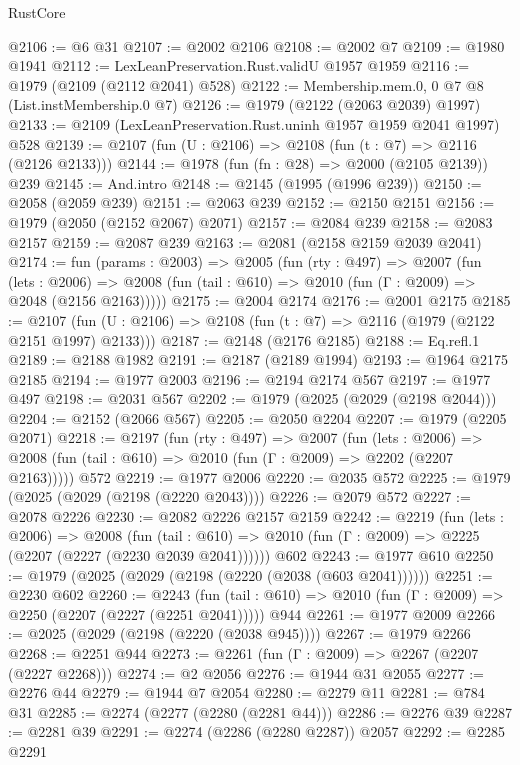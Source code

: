 \begin{lexlean}{RustCore}
\begin{coremodule}
@2106 := @6 @31
@2107 := @2002 @2106
@2108 := @2002 @7
@2109 := @1980 @1941
@2112 := LexLeanPreservation.Rust.validU @1957 @1959
@2116 := @1979 (@2109 (@2112 @2041) @528)
@2122 := Membership.mem.{0, 0} @7 @8 (List.instMembership.{0} @7)
@2126 := @1979 (@2122 (@2063 @2039) @1997)
@2133 := @2109 (LexLeanPreservation.Rust.uninh @1957 @1959 @2041 @1997) @528
@2139 := @2107 (fun (U : @2106) => @2108 (fun (t : @7) => @2116 (@2126 @2133)))
@2144 := @1978 (fun (fn : @28) => @2000 (@2105 @2139)) @239
@2145 := And.intro
@2148 := @2145 (@1995 (@1996 @239))
@2150 := @2058 (@2059 @239)
@2151 := @2063 @239
@2152 := @2150 @2151
@2156 := @1979 (@2050 (@2152 @2067) @2071)
@2157 := @2084 @239
@2158 := @2083 @2157
@2159 := @2087 @239
@2163 := @2081 (@2158 @2159 @2039 @2041)
@2174 := fun (params : @2003) =>
  @2005
    (fun (rty : @497) =>
    @2007
      (fun (lets : @2006) =>
      @2008 (fun (tail : @610) => @2010 (fun (Γ : @2009) => @2048 (@2156 @2163)))))
@2175 := @2004 @2174
@2176 := @2001 @2175
@2185 := @2107 (fun (U : @2106) => @2108 (fun (t : @7) => @2116 (@1979 (@2122 @2151 @1997) @2133)))
@2187 := @2148 (@2176 @2185)
@2188 := Eq.refl.{1}
@2189 := @2188 @1982
@2191 := @2187 (@2189 @1994)
@2193 := @1964 @2175 @2185
@2194 := @1977 @2003
@2196 := @2194 @2174 @567
@2197 := @1977 @497
@2198 := @2031 @567
@2202 := @1979 (@2025 (@2029 (@2198 @2044)))
@2204 := @2152 (@2066 @567)
@2205 := @2050 @2204
@2207 := @1979 (@2205 @2071)
@2218 := @2197
    (fun (rty : @497) =>
    @2007
      (fun (lets : @2006) =>
      @2008 (fun (tail : @610) => @2010 (fun (Γ : @2009) => @2202 (@2207 @2163)))))
    @572
@2219 := @1977 @2006
@2220 := @2035 @572
@2225 := @1979 (@2025 (@2029 (@2198 (@2220 @2043))))
@2226 := @2079 @572
@2227 := @2078 @2226
@2230 := @2082 @2226 @2157 @2159
@2242 := @2219
    (fun (lets : @2006) =>
    @2008
      (fun (tail : @610) => @2010 (fun (Γ : @2009) => @2225 (@2207 (@2227 (@2230 @2039 @2041))))))
    @602
@2243 := @1977 @610
@2250 := @1979 (@2025 (@2029 (@2198 (@2220 (@2038 (@603 @2041))))))
@2251 := @2230 @602
@2260 := @2243
    (fun (tail : @610) => @2010 (fun (Γ : @2009) => @2250 (@2207 (@2227 (@2251 @2041)))))
    @944
@2261 := @1977 @2009
@2266 := @2025 (@2029 (@2198 (@2220 (@2038 @945))))
@2267 := @1979 @2266
@2268 := @2251 @944
@2273 := @2261 (fun (Γ : @2009) => @2267 (@2207 (@2227 @2268)))
@2274 := @2 @2056
@2276 := @1944 @31 @2055
@2277 := @2276 @44
@2279 := @1944 @7 @2054
@2280 := @2279 @11
@2281 := @784 @31
@2285 := @2274 (@2277 (@2280 (@2281 @44)))
@2286 := @2276 @39
@2287 := @2281 @39
@2291 := @2274 (@2286 (@2280 @2287)) @2057
@2292 := @2285 @2291

\end{coremodule}
\end{lexlean}
